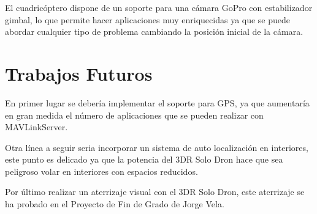 El cuadricóptero dispone de un soporte para una cámara GoPro con estabilizador gimbal, lo que permite hacer aplicaciones muy enriquecidas ya que se puede abordar cualquier tipo de problema cambiando la posición inicial de la cámara.

\section{Trabajos Futuros}

En primer lugar se debería implementar el soporte para GPS, ya que aumentaría en gran medida el número de aplicaciones que se pueden realizar con MAVLinkServer. 

Otra línea a seguir seria incorporar un sistema de auto localización en interiores, este punto es delicado ya que la potencia del 3DR Solo Dron hace que sea peligroso volar en interiores con espacios reducidos.

Por último realizar un aterrizaje visual con el 3DR Solo Dron, este aterrizaje se ha probado en el Proyecto de Fin de Grado de Jorge Vela\cite{jorgeVelaTFG}.
